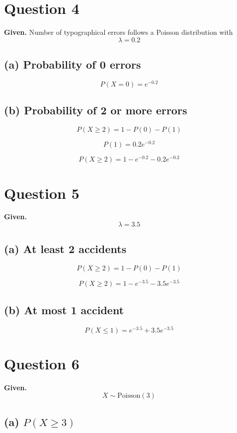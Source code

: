 \documentclass[12pt]{article}
\begin{document}
\section*{Question 4}

\textbf{Given.}  
Number of typographical errors follows a Poisson distribution with
\[
\lambda = 0.2
\]

\subsection*{(a) Probability of 0 errors}

\[
P(X=0) = e^{-0.2}
\]

\subsection*{(b) Probability of 2 or more errors}

\[
P(X \ge 2) = 1 - P(0) - P(1)
\]

\[
P(1) = 0.2 e^{-0.2}
\]

\[
P(X \ge 2) = 1 - e^{-0.2} - 0.2 e^{-0.2}
\]

\section*{Question 5}

\textbf{Given.}
\[
\lambda = 3.5
\]

\subsection*{(a) At least 2 accidents}

\[
P(X \ge 2) = 1 - P(0) - P(1)
\]

\[
P(X \ge 2) = 1 - e^{-3.5} - 3.5 e^{-3.5}
\]

\subsection*{(b) At most 1 accident}

\[
P(X \le 1) = e^{-3.5} + 3.5 e^{-3.5}
\]

\section*{Question 6}

\textbf{Given.}
\[
X \sim \text{Poisson}(3)
\]

\subsection*{(a) $P(X \ge 3)$}
\end{document}
